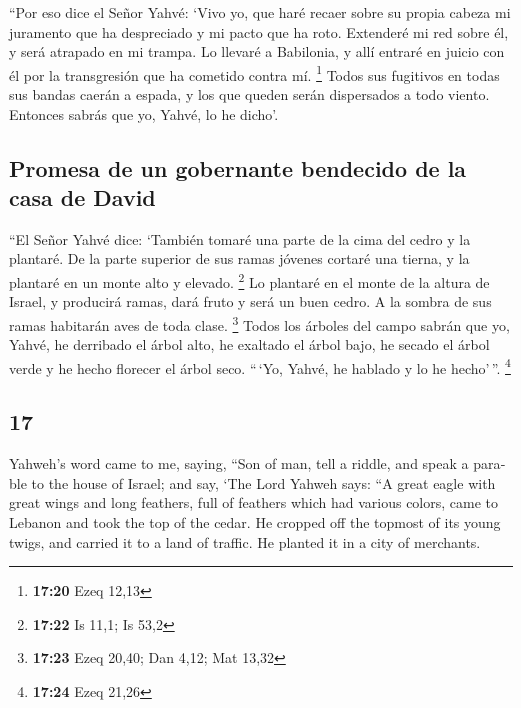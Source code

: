 \begin{paracol}{2}
 ``Por eso dice el Señor Yahvé: `Vivo yo, que haré recaer
sobre su propia cabeza mi juramento que ha despreciado y mi pacto que ha
roto.  Extenderé mi red sobre él, y será atrapado en mi
trampa. Lo llevaré a Babilonia, y allí entraré en juicio con él por la
transgresión que ha cometido contra mí. \footnote{\textbf{17:20} Ezeq
  12,13}  Todos sus fugitivos en todas sus bandas caerán
a espada, y los que queden serán dispersados a todo viento. Entonces
sabrás que yo, Yahvé, lo he dicho'.

\hypertarget{promesa-de-un-gobernante-bendecido-de-la-casa-de-david}{%
\subsection{Promesa de un gobernante bendecido de la casa de
David}\label{promesa-de-un-gobernante-bendecido-de-la-casa-de-david}}

 ``El Señor Yahvé dice: `También tomaré una parte de la
cima del cedro y la plantaré. De la parte superior de sus ramas jóvenes
cortaré una tierna, y la plantaré en un monte alto y elevado.
\footnote{\textbf{17:22} Is 11,1; Is 53,2}  Lo plantaré
en el monte de la altura de Israel, y producirá ramas, dará fruto y será
un buen cedro. A la sombra de sus ramas habitarán aves de toda clase.
\footnote{\textbf{17:23} Ezeq 20,40; Dan 4,12; Mat 13,32}
 Todos los árboles del campo sabrán que yo, Yahvé, he
derribado el árbol alto, he exaltado el árbol bajo, he secado el árbol
verde y he hecho florecer el árbol seco. ``\,`Yo, Yahvé, he hablado y lo
he hecho'\,''. \footnote{\textbf{17:24} Ezeq 21,26}

\switchcolumn
\begin{otherlanguage}{english}

\hypertarget{section-33}{%
\section{17}\label{section-33}}

 Yahweh's word came to me, saying,  ``Son of
man, tell a riddle, and speak a parable to the house of Israel;
 and say, `The Lord Yahweh says: ``A great eagle with
great wings and long feathers, full of feathers which had various
colors, came to Lebanon and took the top of the cedar.  He
cropped off the topmost of its young twigs, and carried it to a land of
traffic. He planted it in a city of merchants.


\end{otherlanguage}
\end{paracol}
